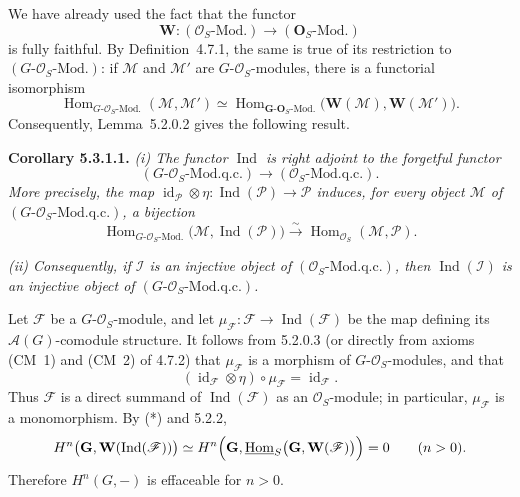 We have already used the fact that the functor
\[
  \mathbf W:(\mathscr O_S\text{-Mod.})
    \longrightarrow(\mathbf O_S\text{-Mod.})
\]
is fully faithful. By Definition~4.7.1, the same is true of its restriction
to \((G\text{-}\mathscr O_S\text{-Mod.})\): if \(\mathscr M\) and
\(\mathscr M'\) are \(G\)-\(\mathscr O_S\)-modules, there is a functorial
isomorphism
\[
  \operatorname{Hom}_{G\text{-}\mathscr O_S\text{-Mod.}}
    (\mathscr M,\mathscr M')
  \simeq
  \operatorname{Hom}_{\mathbf G\text{-}\mathbf O_S\text{-Mod.}}
    \bigl(\mathbf W(\mathscr M),\mathbf W(\mathscr M')\bigr).
\]
Consequently, Lemma~5.2.0.2 gives the following result.

\medskip
\noindent\textbf{Corollary 5.3.1.1.}
\textit{(i) The functor \(\operatorname{Ind}\) is right adjoint to the
forgetful functor}
\[
  (G\text{-}\mathscr O_S\text{-Mod.q.c.})
    \longrightarrow(\mathscr O_S\text{-Mod.q.c.}).
\]
\textit{More precisely, the map
\(\operatorname{id}_{\mathscr P}\otimes\eta:
  \operatorname{Ind}(\mathscr P)\to\mathscr P\)
induces, for every object \(\mathscr M\) of
\((G\text{-}\mathscr O_S\text{-Mod.q.c.})\), a bijection}
\[
  \operatorname{Hom}_{G\text{-}\mathscr O_S\text{-Mod.}}
    \bigl(\mathscr M,\operatorname{Ind}(\mathscr P)\bigr)
  \xrightarrow{\ \sim\ }
  \operatorname{Hom}_{\mathscr O_S}(\mathscr M,\mathscr P).
\]

\textit{(ii) Consequently, if \(\mathscr I\) is an injective object of
\((\mathscr O_S\text{-Mod.q.c.})\), then
\(\operatorname{Ind}(\mathscr I)\) is an injective object of
\((G\text{-}\mathscr O_S\text{-Mod.q.c.})\).}

Let \(\mathscr F\) be a \(G\)-\(\mathscr O_S\)-module, and let
\(\mu_{\mathscr F}:\mathscr F\to\operatorname{Ind}(\mathscr F)\) be the
map defining its \(\mathscr A(G)\)-comodule structure. It follows from
5.2.0.3 (or directly from axioms (CM~1) and (CM~2) of 4.7.2) that
\(\mu_{\mathscr F}\) is a morphism of
\(G\)-\(\mathscr O_S\)-modules, and that
\[
  (\operatorname{id}_{\mathscr F}\otimes\eta)\circ\mu_{\mathscr F}
    =\operatorname{id}_{\mathscr F}.
\]
Thus \(\mathscr F\) is a direct summand of
\(\operatorname{Ind}(\mathscr F)\) as an \(\mathscr O_S\)-module; in
particular, \(\mu_{\mathscr F}\) is a monomorphism. By (*) and 5.2.2,
\[
  H^n\bigl(\mathbf G,\mathbf W(\operatorname{Ind}(\mathscr F))\bigr)
    \simeq
  H^n\Bigl(
    \mathbf G,
    \underline{\operatorname{Hom}}_S
      \bigl(\mathbf G,\mathbf W(\mathscr F)\bigr)
  \Bigr)
    =0
  \qquad(n>0).
\]
Therefore \(H^n(G,-)\) is effaceable for \(n>0\).

